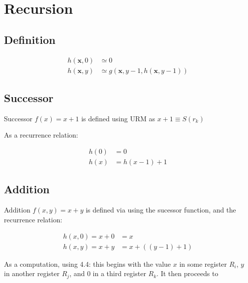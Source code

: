 \documentclass[fleqn]{article}
\begin{document}
\section{Recursion}

\subsection{Definition}

\begin{align*}
h(\mathbf{x}, 0) &\simeq 0 \\
h(\mathbf{x}, y) &\simeq g(\mathbf{x}, y-1, h(\mathbf{x}, y-1))
\end{align*}

\subsection{Successor}

Successor $f(x) = x + 1$ is defined using URM as $x + 1 \equiv S(r_k)$

As a recurrence relation:

\begin{align*}
h(0) &= 0 \\
h(x) &= h(x-1) + 1
\end{align*}

\subsection{Addition}

Addition $f(x, y) = x + y$ is defined via using the sucessor function, and the recurrence relation:

\begin{align*}
h(x, 0) = x + 0 &= x \\
h(x, y) = x + y &= x + ((y - 1) + 1)
\end{align*}

As a computation, using 4.4: this begins with the value $x$ in some register $R_i$, $y$ in another register $R_j$, and $0$ in a third register $R_k$.
It then proceeds to  
\end{document}
